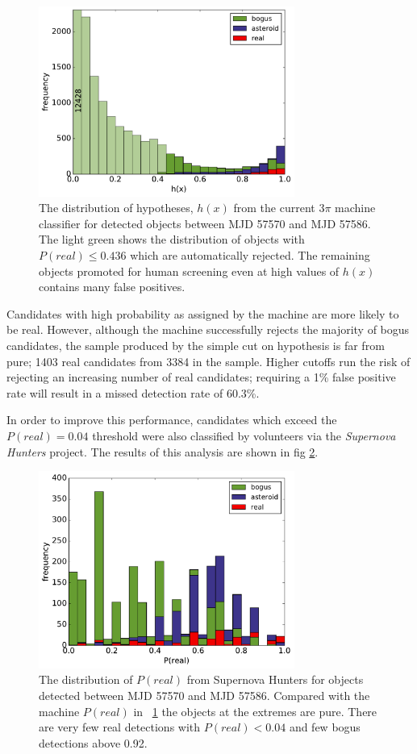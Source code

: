 \documentclass[a4paper,fleqn,usenatbib]{mnras}
\begin{document}
\begin{figure}
   \includegraphics[width=84mm]{figs/machine_hist.pdf}
   \caption{The distribution of hypotheses, $h(x)$ from the current 3$\pi$ machine classifier 
            for detected objects between MJD 57570 and MJD 57586.  The light green shows the distribution of 
            objects with $P(real) \leq 0.436$ which are automatically rejected.  The remaining 
            objects promoted for human screening even at high values of $h(x)$ contains
            many false positives.} 
   \label{fig:machine_dist} 
\end{figure}

Candidates with high probability as assigned by the machine are more likely to be real. However, although the machine successfully rejects the majority of bogus candidates, the sample produced by the simple cut on hypothesis is far from pure; 1403 real candidates from 3384 in the sample. Higher cutoffs run the risk of rejecting an increasing number of real candidates; requiring a 1\% false positive rate will result in a missed detection rate of 60.3\%. 

In order to improve this performance, candidates which exceed the $P(real) = 0.04$ threshold were also classified by volunteers via the \emph{Supernova Hunters} project. The results of this analysis are shown in fig \ref{fig:human_dist}. 

\begin{figure}
   \includegraphics[width=84mm]{figs/human_hist.pdf}
   \caption{The distribution of $P(real)$ from Supernova Hunters for objects detected between 
            MJD 57570 and MJD 57586.  Compared with the machine $P(real)$ in ~\ref{fig:machine_dist}
            the objects at the extremes are pure.  There are very few real detections with 
            $P(real) < 0.04$ and few bogus detections above 0.92.} 
   \label{fig:human_dist} 
\end{figure}
\end{document}
